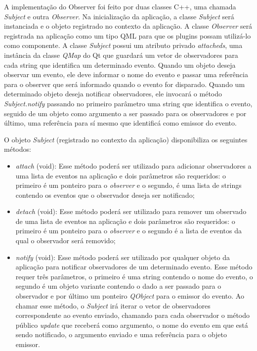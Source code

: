 A implementação do Observer foi feito por duas classes C++, uma chamada \textit{Subject} e outra \textit{Observer}. Na inicialização da aplicação, a classe \textit{Subject} será instanciada e o objeto registrado no contexto da aplicação. A classe \textit{Observer} será registrada na aplicação como um tipo QML para que os plugins possam utilizá-lo como componente. A classe \textit{Subject} possui um atributo privado \textit{attacheds}, uma instância da classe \textit{QMap} do Qt que guardará um vetor de observadores para cada string que identifica um determinado evento. Quando um objeto deseja observar um evento, ele deve informar o nome do evento e passar uma referência para o observer que será informado quando o evento for disparado. Quando um determinado objeto deseja notificar observadores, ele invocará o método \textit{Subject.notify} passando no primeiro parâmetro uma string que identifica o evento, seguido de um objeto como argumento a ser passado para os observadores e por último, uma referência para sí mesmo que identificá como emissor do evento.

O objeto \textit{Subject} (registrado no contexto da aplicação) disponibiliza os seguintes métodos:

\begin{itemize}
	\item \textit{attach} (void): Esse método poderá ser utilizado para adicionar observadores a uma lista de eventos na aplicação e dois parâmetros são requeridos: o primeiro é um ponteiro para o \textit{observer} e o segundo, é uma lista de strings contendo os eventos que o observador deseja ser notificado;

	\item \textit{detach} (void): Esse método poderá ser utilizado para remover um observado de uma lista de eventos na aplicação e dois parâmetros são requeridos: o primeiro é um ponteiro para o \textit{observer} e o segundo é a lista de eventos da qual o observador será removido;

	\item \textit{notify} (void): Esse método poderá ser utilizado por qualquer objeto da aplicação para notificar observadores de um determinado evento. Esse método requer três parâmetros, o primeiro é uma string contendo o nome do evento, o segundo é um objeto variante contendo o dado a ser passado para o observador e por último um ponteiro \textit{QObject} para o emissor do evento. Ao chamar esse método, o \textit{Subject} irá iterar o vetor de observadores correspondente ao evento enviado, chamando para cada observador o método público \textit{update} que receberá como argumento, o nome do evento em que está sendo notificado, o argumento enviado e uma referência para o objeto emissor.
\end{itemize}

